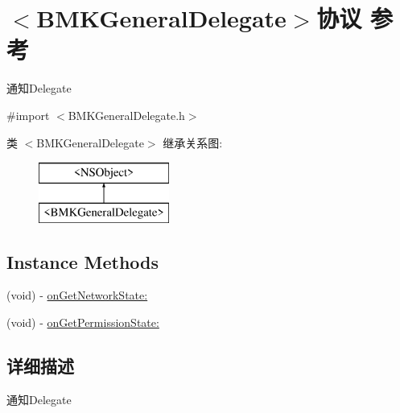 \hypertarget{protocol_b_m_k_general_delegate-p}{\section{$<$B\+M\+K\+General\+Delegate$>$协议 参考}
\label{protocol_b_m_k_general_delegate-p}
}


通知\+Delegate  




{\ttfamily \#import $<$B\+M\+K\+General\+Delegate.\+h$>$}

类 $<$B\+M\+K\+General\+Delegate$>$ 继承关系图\+:\begin{figure}[H]
\begin{center}
\leavevmode
\includegraphics[height=2.000000cm]{protocol_b_m_k_general_delegate-p}
\end{center}
\end{figure}
\subsection*{Instance Methods}
\begin{DoxyCompactItemize}
\item 
(void) -\/ \hyperlink{protocol_b_m_k_general_delegate-p_ad30d0a4dc9bb54cda10cb892ed769491}{on\+Get\+Network\+State\+:}
\item 
(void) -\/ \hyperlink{protocol_b_m_k_general_delegate-p_ab0c34f007a8be34196fc81f2c7b3cddb}{on\+Get\+Permission\+State\+:}
\end{DoxyCompactItemize}


\subsection{详细描述}
通知\+Delegate 

